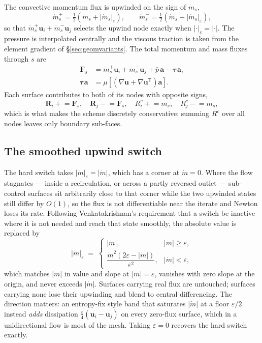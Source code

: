 \documentclass[11pt,a4paper]{article}
\newcommand{\bu}{\mathbf{u}}
\newcommand{\ba}{\mathbf{a}}
\newcommand{\bF}{\mathbf{F}}
\newcommand{\bR}{\mathbf{R}}
\newcommand{\bttau}{\boldsymbol{\tau}}
\newcommand{\mdot}{\dot m}
\begin{document}
The convective momentum flux is upwinded on the sign of $\mdot_s$,
\begin{equation}
  \mdot_s^{+} = \tfrac12\left(\mdot_s + |\mdot_s|_\varepsilon\right), \qquad
  \mdot_s^{-} = \tfrac12\left(\mdot_s - |\mdot_s|_\varepsilon\right),
  \label{eq:mpm}
\end{equation}
so that $\mdot_s^{+} \bu_i + \mdot_s^{-} \bu_j$ selects the upwind node exactly when
$|\cdot|_\varepsilon = |\cdot|$. The pressure is interpolated centrally and the viscous
traction is taken from the element gradient of \S\ref{sec:geomvariants}. The total momentum
and mass fluxes through $s$ are
\begin{align}
  \bF_s &= \mdot_s^{+} \bu_i + \mdot_s^{-} \bu_j + \bar p \, \ba - \bttau \ba ,
  \label{eq:flux} \\
  \bttau \ba &= \mu \left[ \left( \nabla\bu + \nabla\bu^{\mathsf T} \right) \ba \right] .
  \nonumber
\end{align}
Each surface contributes to both of its nodes with opposite signs,
\begin{equation}
  \bR_i \mathrel{+}= \bF_s , \quad
  \bR_j \mathrel{-}= \bF_s , \quad
  R^{c}_i \mathrel{+}= \mdot_s , \quad
  R^{c}_j \mathrel{-}= \mdot_s ,
  \label{eq:scatter}
\end{equation}
which is what makes the scheme discretely conservative: summing $R^c$ over all nodes leaves
only boundary sub-faces.

\subsection{The smoothed upwind switch}
\label{sec:upwind}

The hard switch takes $|\mdot|_\varepsilon = |\mdot|$, which has a corner at $\mdot = 0$.
Where the flow stagnates --- inside a recirculation, or across a partly reversed outlet ---
sub-control surfaces sit arbitrarily close to that corner while the two upwinded states still
differ by $O(1)$, so the flux is not differentiable near the iterate and Newton loses its
rate. Following Venkatakrishnan's requirement that a switch be inactive where it is not
needed and reach that state smoothly, the absolute value is replaced by
\begin{equation}
  |\mdot|_\varepsilon \;=\;
  \begin{cases}
    |\mdot| , & |\mdot| \ge \varepsilon , \\[4pt]
    \dfrac{\mdot^2 \left( 2\varepsilon - |\mdot| \right)}{\varepsilon^2} , & |\mdot| < \varepsilon ,
  \end{cases}
  \label{eq:band}
\end{equation}
which matches $|\mdot|$ in value and slope at $|\mdot| = \varepsilon$, vanishes with zero
slope at the origin, and never exceeds $|\mdot|$. Surfaces carrying real flux are untouched;
surfaces carrying none lose their upwinding and blend to central differencing. The direction
matters: an entropy-fix style band that saturates $|\mdot|$ at a floor $\varepsilon/2$ instead
\emph{adds} dissipation $\tfrac{\varepsilon}{4}(\bu_i - \bu_j)$ on every zero-flux surface,
which in a unidirectional flow is most of the mesh. Taking $\varepsilon = 0$ recovers the hard
switch exactly.
\end{document}
